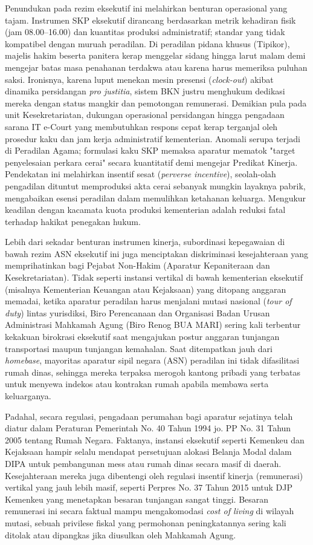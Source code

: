 \documentclass[12pt, a4paper]{article}
\begin{document}
Penundukan pada rezim eksekutif ini melahirkan benturan operasional yang tajam. Instrumen SKP eksekutif dirancang berdasarkan metrik kehadiran fisik (jam 08.00--16.00) dan kuantitas produksi administratif; standar yang tidak kompatibel dengan muruah peradilan. Di peradilan pidana khusus (Tipikor), majelis hakim beserta panitera kerap menggelar sidang hingga larut malam demi mengejar batas masa penahanan terdakwa atau karena harus memeriksa puluhan saksi. Ironisnya, karena luput menekan mesin presensi (\textit{clock-out}) akibat dinamika persidangan \textit{pro justitia}, sistem BKN justru menghukum dedikasi mereka dengan status mangkir dan pemotongan remunerasi. Demikian pula pada unit Kesekretariatan, dukungan operasional persidangan hingga pengadaan sarana IT e-Court yang membutuhkan respons cepat kerap terganjal oleh prosedur kaku dan jam kerja administratif kementerian. Anomali serupa terjadi di Peradilan Agama; formulasi kaku SKP memaksa aparatur mematok "target penyelesaian perkara cerai" secara kuantitatif demi mengejar Predikat Kinerja. Pendekatan ini melahirkan insentif sesat (\textit{perverse incentive}), seolah-olah pengadilan dituntut memproduksi akta cerai sebanyak mungkin layaknya pabrik, mengabaikan esensi peradilan dalam memulihkan ketahanan keluarga. Mengukur keadilan dengan kacamata kuota produksi kementerian adalah reduksi fatal terhadap hakikat penegakan hukum.

Lebih dari sekadar benturan instrumen kinerja, subordinasi kepegawaian di bawah rezim ASN eksekutif ini juga menciptakan diskriminasi kesejahteraan yang memprihatinkan bagi Pejabat Non-Hakim (Aparatur Kepaniteraan dan Kesekretariatan). Tidak seperti instansi vertikal di bawah kementerian eksekutif (misalnya Kementerian Keuangan atau Kejaksaan) yang ditopang anggaran memadai, ketika aparatur peradilan harus menjalani mutasi nasional (\textit{tour of duty}) lintas yurisdiksi, Biro Perencanaan dan Organisasi Badan Urusan Administrasi Mahkamah Agung (Biro Renog BUA MARI) sering kali terbentur kekakuan birokrasi eksekutif saat mengajukan postur anggaran tunjangan transportasi maupun tunjangan kemahalan. Saat ditempatkan jauh dari \textit{homebase}, mayoritas aparatur sipil negara (ASN) peradilan ini tidak difasilitasi rumah dinas, sehingga mereka terpaksa merogoh kantong pribadi yang terbatas untuk menyewa indekos atau kontrakan rumah apabila membawa serta keluarganya. 

Padahal, secara regulasi, pengadaan perumahan bagi aparatur sejatinya telah diatur dalam Peraturan Pemerintah No. 40 Tahun 1994 jo. PP No. 31 Tahun 2005 tentang Rumah Negara. Faktanya, instansi eksekutif seperti Kemenkeu dan Kejaksaan hampir selalu mendapat persetujuan alokasi Belanja Modal dalam DIPA untuk pembangunan mess atau rumah dinas secara masif di daerah. Kesejahteraan mereka juga dibentengi oleh regulasi insentif kinerja (remunerasi) vertikal yang jauh lebih masif, seperti Perpres No. 37 Tahun 2015 untuk DJP Kemenkeu yang menetapkan besaran tunjangan sangat tinggi. Besaran remunerasi ini secara faktual mampu mengakomodasi \textit{cost of living} di wilayah mutasi, sebuah privilese fiskal yang permohonan peningkatannya sering kali ditolak atau dipangkas jika diusulkan oleh Mahkamah Agung.
\end{document}
